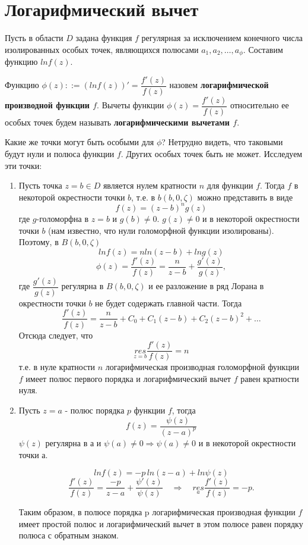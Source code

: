 \documentclass[a4paper, 12pt]{report}
\begin{document}
\section{Логарифмический вычет}

Пусть в области $D$ задана функция $f$ регулярная за исключением конечного числа изолированных особых точек, являющихся полюсами $a_1,a_2,\dots,a_\phi.$ Составим функцию $lnf(z).$ \par Функцию $\phi(z)::=(ln f(z))'= \dfrac{f'(z)}{f(z)}$ назовем \textbf{логарифмической производной функции $f$}. Вычеты функции $\phi(z)=\dfrac{f'(z)}{f(z)}$ относительно ее особых точек будем называть \textbf{логарифмическими вычетами $f$}. \par\bigskip Какие же точки могут быть особыми для $\phi$? Нетрудно видеть, что таковыми будут нули и полюса функции $f$. Других особых точек быть не может. Исследуем эти точки:
\begin{enumerate}
    \item Пусть точка $z=b\in D$ является нулем кратности $n$ для функции $f$. Тогда $f$ в некоторой окрестности точки $b$, т.е. в $b(b,0,\zeta)$ можно представить в виде $$f(z)=(z-b)^ng(z)$$ где $g$-голоморфна в $z=b$ и $g(b)\ne 0.$  $g(z)\ne 0$ и в некоторой окрестности точки $b$ (нам известно, что нули голоморфной функции изолированы). Поэтому, в $B(b,0,\zeta)$ $$lnf(z)=n ln(z-b)+ln g(z)$$  $$\phi(z)=\dfrac{f'(z)}{f(z)}=\dfrac{n}{z-b}+\dfrac{g'(z)}{g(z)},$$ где $\dfrac{g'(z)}{g(z)}$ регулярна в $B(b,0,\zeta)$ и ее разложение в ряд Лорана в окрестности точки $b$ не будет содержать главной части. Тогда $$ \dfrac{f'(z)}{f(z)}=\dfrac{n}{z-b}+ C_0 + C_1(z-b)+C_2(z-b)^2+\dots$$ Отсюда следует, что $$\underset{z=b}{res}\dfrac{f'(z)}{f(z)}=n$$ т.е. в нуле кратности $n$ логарифмическая производная голоморфной функции $f$ имеет полюс первого порядка и логарифмический вычет $f$ равен кратности нуля.
    
    \item Пусть $z=a$ - полюс порядка $p$ функции $f$, тогда $$f(z)=\dfrac{\psi(z)}{(z-a)^p}$$ $\psi(z)$ регулярна в а и $\psi(a)\ne 0\Rightarrow \psi(a)\ne 0$ и в некоторой окрестности точки а.

$$ln f(z) = - p\,ln(z-a)+ln\psi(z)$$
$$\dfrac{f'(z)}{f(z)}= \dfrac{-p}{z-a}+\dfrac{\psi'(z)}{\psi(z)}\quad \Rightarrow \quad \underset{a}{res}\dfrac{f'(z)}{f(z)}=-p.$$

Таким образом, в полюсе порядка p логарифмическая производная функции $f$ имеет простой полюс и логарифмический вычет в этом полюсе равен порядку полюса с обратным знаком.
\end{enumerate}
\end{document}
